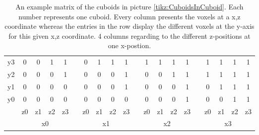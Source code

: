 \begin{table}[ht]
\centering
\caption[A matrix to determine which voxel is within the sphere or not]{An example matrix of the cuboids in picture \ref{tikz:CuboidsInCuboid}. Each number represents one cuboid. Every column presents the voxels at a x,z coordinate whereas the entries in the row display the different voxels at the y-axis for this given x,z coordinate. 4 columns regarding to the different z-positions at one x-postion.  \newline}
\renewcommand{\arraystretch}{1.5}
	\begin{tabularx}{\textwidth}{cccccccccccccccccccc}
		y3 & 0 & 0 & 1 & 1 & &  0 & 1 & 1 & 1 & & 1 & 1 & 1 & 1 & & 1 & 1 & 1 & 1 \\
		y2 & 0 & 0 & 0 & 1 & &  0 & 0 & 0 & 1 & & 0 & 0 & 1 & 1 & & 1 & 1 & 1 & 1 \\
		y1 & 0 & 0 & 0 & 0 & &  0 & 0 & 0 & 1 & & 0 & 0 & 0 & 1 & & 0 & 1 & 1 & 1 \\
		y0 & 0 & 0 & 0 & 0 & &  0 & 0 & 0 & 0 & & 0 & 0 & 0 & 1 & & 0 & 0 & 1 & 1 \\
		   & z0 & z1 & z2 & z3 & & z0 & z1 & z2 & z3 & & z0 & z1 & z2 & z3 & & z0 & z1 & z2 & z3 \\
		   & \multicolumn{4}{c}{x0} & & \multicolumn{4}{c}{x1} & & \multicolumn{4}{c}{x2} & & \multicolumn{4}{c}{x3} 

	\end{tabularx}
	\label{tbl:MatrixCuboidsInCuboidSphere}
\end{table}